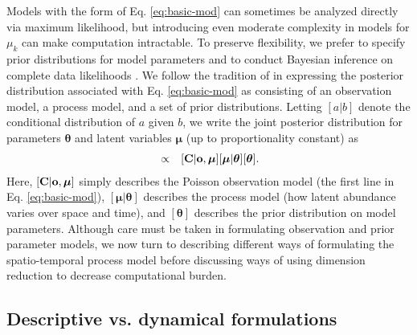 \documentclass[12pt,english]{article}
\begin{document}
\begin{spacing}{1.9}
Models with the form of Eq. \ref{eq:basic-mod} can sometimes be analyzed directly via maximum likelihood, but introducing even moderate complexity in models for $\mu_k$ can make computation intractable.  To preserve flexibility, we prefer to specify prior distributions for model parameters and to conduct Bayesian inference \citep{GelmanEtAl2004} on complete data likelihoods \citep{Dempster1977}.   We follow the tradition of \citet{Berliner1996} in expressing the posterior distribution associated with Eq. \ref{eq:basic-mod} as consisting of an observation model, a process model, and a set of
prior distributions.  Letting $[a|b]$ denote the conditional distribution of $a$ given $b$, we write the joint posterior distribution for parameters $\boldsymbol{\theta}$ and latent variables $\boldsymbol{\mu}$ (up to proportionality constant) as
\begin{eqnarray}
  [\boldsymbol{\mu},\boldsymbol{\theta} | {\bf C},{\bf o}] & \propto & [{\bf C} | {\bf o}, \boldsymbol{\mu}] [\boldsymbol{\mu} | \boldsymbol{\theta}] [\boldsymbol{\theta}].
  \label{eq:hmod}
\end{eqnarray}
Here, $[{\bf C} | {\bf o}, \boldsymbol{\mu}]$ simply describes the Poisson observation model (the first line in Eq. \ref{eq:basic-mod}), $[\boldsymbol{\mu} | \boldsymbol{\theta}]$ describes the process model (how latent abundance varies over space and time), and $[\boldsymbol{\theta}]$ describes the prior distribution on model parameters.  Although care must be taken in formulating observation and prior parameter models, we now turn to describing different ways of formulating the spatio-temporal process model before discussing ways of using dimension reduction to decrease computational burden.

\subsection{Descriptive vs. dynamical formulations}


\end{spacing}
\end{document}
